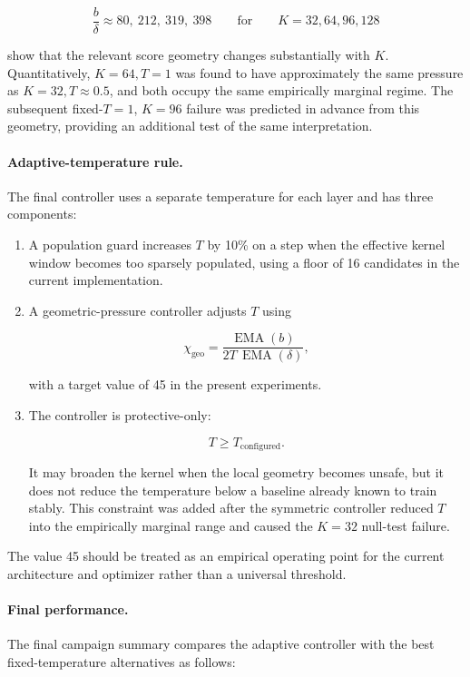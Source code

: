 \documentclass[11pt,a4paper]{article}
\newcommand{\chigeo}{\chi_{\mathrm{geo}}}
\newcommand{\EMA}{\operatorname{EMA}}
\begin{document}
\[
\frac{b}{\delta}
\approx
80,\ 212,\ 319,\ 398
\qquad
\text{for}
\qquad
K=32,64,96,128
\]

show that the relevant score geometry changes substantially with \(K\).
Quantitatively, \(K=64,T=1\) was found to have approximately the same pressure
as \(K=32,T\approx0.5\), and both occupy the same empirically marginal regime.
The subsequent fixed-\(T=1\), \(K=96\) failure was predicted in advance from
this geometry, providing an additional test of the same interpretation.

\paragraph{Adaptive-temperature rule.}
The final controller uses a separate temperature for each layer and has three
components:

\begin{enumerate}[leftmargin=1.6em]

\item A population guard increases \(T\) by 10\% on a step when the effective
kernel window becomes too sparsely populated, using a floor of 16 candidates
in the current implementation.

\item A geometric-pressure controller adjusts \(T\) using

\[
\chigeo
=
\frac{\EMA(b)}{2T\,\EMA(\delta)},
\]

with a target value of 45 in the present experiments.

\item The controller is protective-only:

\[
T \ge T_{\mathrm{configured}}.
\]

It may broaden the kernel when the local geometry becomes unsafe, but it does
not reduce the temperature below a baseline already known to train stably.
This constraint was added after the symmetric controller reduced \(T\) into the
empirically marginal range and caused the \(K=32\) null-test failure.

\end{enumerate}

The value 45 should be treated as an empirical operating point for the current
architecture and optimizer rather than a universal threshold.

\paragraph{Final performance.}
The final campaign summary compares the adaptive controller with the best
fixed-temperature alternatives as follows:
\end{document}

